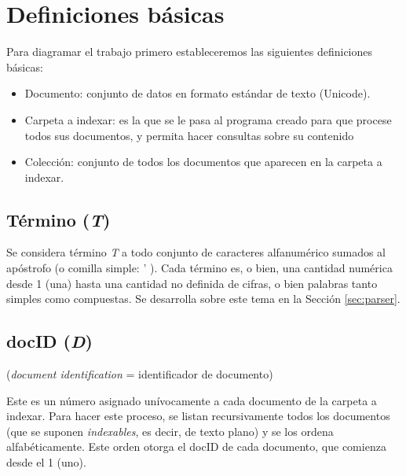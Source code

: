 \section{Definiciones básicas}

Para diagramar el trabajo primero estableceremos las siguientes definiciones básicas:
\begin{itemize}


\item Documento: conjunto de datos en formato estándar de texto (Unicode).

\item Carpeta a indexar: es la que se le pasa al programa creado para que procese todos sus documentos, y permita hacer consultas sobre su contenido

\item Colección: conjunto de todos los documentos que aparecen en la carpeta a indexar.

\end{itemize}


\subsection{Término (\textnormal{\itshape T})}

 
Se considera término \textit{T} a todo conjunto de caracteres alfanumérico sumados al apóstrofo (o comilla simple: ' ). Cada término es, o bien, una cantidad numérica desde 1 (una) hasta una cantidad no definida de cifras, o bien palabras tanto simples como compuestas. Se desarrolla sobre este tema en la Sección \ref{sec:parser}.


\subsection{docID (\textnormal{\itshape D})}
\noindent (\textit{document identification} = identificador de documento)

Este es un número asignado unívocamente a cada documento de la carpeta a indexar. Para hacer este proceso, se listan recursivamente todos los documentos (que se suponen \textit{indexables}, es decir, de texto plano) y se los ordena alfabéticamente. Este orden otorga el docID de cada documento, que comienza desde el 1 (uno).


